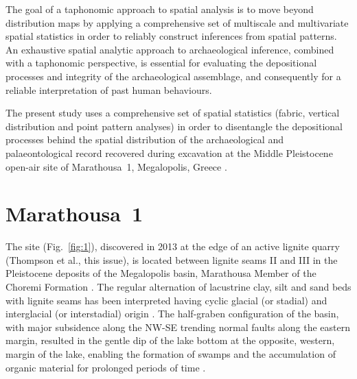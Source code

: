 \documentclass[review,authoryear,times]{elsarticle} %
\begin{document}
The goal of a taphonomic approach to spatial analysis is to move beyond distribution maps by applying a comprehensive set of multiscale and multivariate spatial statistics in order to reliably construct inferences from spatial patterns. An exhaustive spatial analytic approach to archaeological inference, combined with a taphonomic perspective, is essential for evaluating the depositional processes and integrity of the archaeological assemblage, and consequently for a reliable interpretation of past human behaviours.

The present study uses a comprehensive set of spatial statistics (fabric, vertical distribution and point pattern analyses) in order to disentangle the depositional processes behind the spatial distribution of the archaeological and palaeontological record recovered during excavation at the Middle Pleistocene open-air site of Marathousa~1, Megalopolis, Greece \citep{Panagopoulou2015,Harvati2016}.

\section{Marathousa~1}

The site (Fig.~\ref{fig:1}), discovered in 2013 at the edge of an active lignite quarry (Thompson et al., this issue), is located between lignite seams II and III in the Pleistocene deposits of the Megalopolis basin, Marathousa Member of the Choremi Formation \citep{Vugt2000}. The regular alternation of lacustrine clay, silt and sand beds with lignite seams has been interpreted having cyclic glacial (or stadial) and interglacial (or interstadial) origin \citep{Nickel1996}. The half-graben configuration of the basin, with major subsidence along the NW-SE trending normal faults along the eastern margin, resulted in the gentle dip of the lake bottom at the opposite, western, margin of the lake, enabling the formation of swamps and the accumulation of organic material for prolonged periods of time \citep{Vugt2000}.
\end{document}
